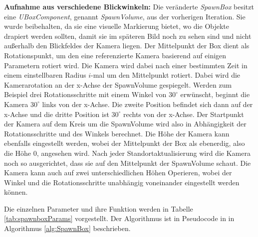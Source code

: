 \textbf{Aufnahme aus verschiedene Blickwinkeln:} Die veränderte \textit{SpawnBox} besitzt eine \textit{UBoxComponent}, genannt \textit{SpawnVolume}, aus der vorherigen Iteration. Sie wurde beibehalten, da sie eine visuelle Markierung bietet, wo die Objekte drapiert werden sollten, damit sie im späteren Bild noch zu sehen sind und nicht außerhalb den Blickfeldes der Kamera liegen. Der Mittelpunkt der Box dient als Rotationspunkt, um den eine referenzierte Kamera basierend auf einigen Parametern rotiert wird. Die Kamera wird dabei nach einer bestimmten Zeit in einem einstellbaren Radius $i$-mal um den Mittelpunkt rotiert. Dabei wird die Kamerarotation an der x-Achse der SpawnVolume gespiegelt. Werden zum Beispiel drei Rotationsschritte mit einem Winkel von $30^\circ$ erwünscht, beginnt die Kamera $30^\circ$ links von der x-Achse. Die zweite Position befindet sich dann auf der x-Achse und die dritte Position ist $30^\circ$ rechts von der x-Achse. Der Startpunkt der Kamera auf dem Kreis um die SpawnVolume wird also in Abhängigkeit der Rotationsschritte und des Winkels berechnet. Die Höhe der Kamera kann ebenfalls eingestellt werden, wobei der Mittelpunkt der Box als ebenerdig, also die Höhe 0, angesehen wird. Nach jeder Standortaktualisierung wird die Kamera noch so ausgerichtet, dass sie auf den Mittelpunkt der SpawnVolume schaut. Die Kamera kann auch auf zwei unterschiedlichen Höhen Operieren, wobei der Winkel und die Rotationsschritte unabhängig voneinander eingestellt werden können. \par
Die einzelnen Parameter und ihre Funktion werden in Tabelle \ref{tab:spawnboxParams} vorgestellt. Der Algorithmus ist in Pseudocode in in Algorithmus \ref{alg:SpawnBox} beschrieben.

